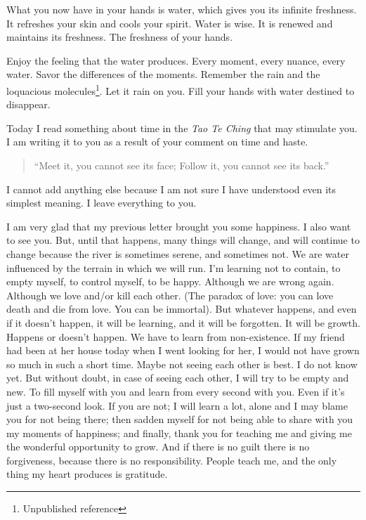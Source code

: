 \documentclass[]{book}
\let\rmarkdownfootnote\footnote%
\def\footnote{\protect\rmarkdownfootnote}
\begin{document}
What you now have in your hands is water, which gives you its infinite freshness. It refreshes your skin and cools your spirit. Water is wise. It is renewed and maintains its freshness. The freshness of your hands.

Enjoy the feeling that the water produces. Every moment, every nuance, every water. Savor the differences of the moments. Remember the rain and the loquacious molecules\footnote{Unpublished reference}. Let it rain on you. Fill your hands with water destined to disappear.

Today I read something about time in the \emph{Tao Te Ching} that may stimulate you. I am writing it to you as a result of your comment on time and haste.

\begin{quote}
``Meet it, you cannot see its face;
Follow it, you cannot see its back.''
\end{quote}

I cannot add anything else because I am not sure I have understood even its simplest meaning. I leave everything to you.

I am very glad that my previous letter brought you some happiness. I also want to see you. But, until that happens, many things will change, and will continue to change because the river is sometimes serene, and sometimes not. We are water influenced by the terrain in which we will run. I'm learning not to contain, to empty myself, to control myself, to be happy. Although we are wrong again. Although we love and/or kill each other. (The paradox of love: you can love death and die from love. You can be immortal). But whatever happens, and even if it doesn't happen, it will be learning, and it will be forgotten. It will be growth. Happens or doesn't happen. We have to learn from non-existence. If my friend had been at her house today when I went looking for her, I would not have grown so much in such a short time. Maybe not seeing each other is best. I do not know yet. But without doubt, in case of seeing each other, I will try to be empty and new. To fill myself with you and learn from every second with you. Even if it's just a two-second look. If you are not; I will learn a lot, alone and I may blame you for not being there; then sadden myself for not being able to share with you my moments of happiness; and finally, thank you for teaching me and giving me the wonderful opportunity to grow. And if there is no guilt there is no forgiveness, because there is no responsibility. People teach me, and the only thing my heart produces is gratitude.
\end{document}
